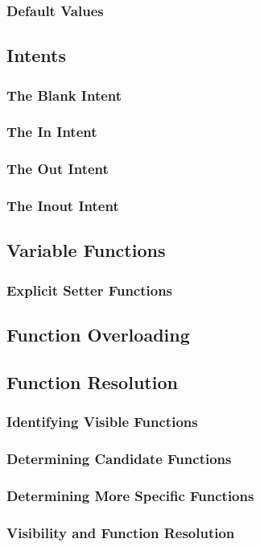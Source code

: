 \documentclass[10pt,twoside,titlepage]{article}
\begin{document}
\subsubsection{Default Values}
\subsection{Intents}
\subsubsection{The Blank Intent}
\subsubsection{The In Intent}
\subsubsection{The Out Intent}
\subsubsection{The Inout Intent}
\subsection{Variable Functions}
\subsubsection{Explicit Setter Functions}
\subsection{Function Overloading}
\subsection{Function Resolution}
\subsubsection{Identifying Visible Functions}
\subsubsection{Determining Candidate Functions}
\subsubsection{Determining More Specific Functions}
\subsubsection{Visibility and Function Resolution}
\end{document}
